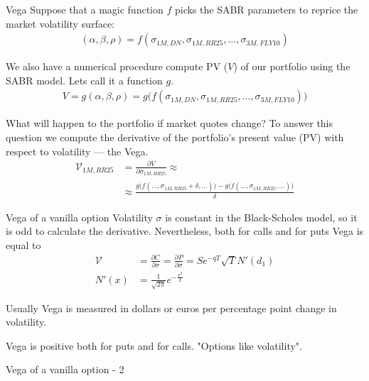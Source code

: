 \documentclass{beamer}
\begin{document}
\begin{frame}{Vega}
\justify
Suppose that a magic function $f$ picks the SABR parameters to reprice the market volatility surface:
\begin{align*}
(\alpha, \beta, \rho) = f(\sigma_{1M,DN}, \sigma_{1M,RR25}, ..., \sigma_{3M,FLY10})
\end{align*}

\justify
We also have a numerical procedure compute PV ($V$) of our portfolio using the SABR model. Lets call it a function $g$.
\begin{align*}
V = g(\alpha, \beta, \rho) = g\Big(f(\sigma_{1M,DN}, \sigma_{1M,RR25}, ..., \sigma_{3M,FLY10})\Big)
\end{align*}

\justify
What will happen to the portfolio if market quotes change? To answer this question we compute the derivative of the portfolio's present value (PV) with respect to volatility --- the \alert{Vega}.
\begin{align*}
\mathcal{V}_{1M,RR25} &= \frac{\partial V}{\partial \sigma_{1M,RR25}} \approx \\
&\approx \frac{g\Big(f(...,\sigma_{1M,RR25}+\delta,...)\Big) - g\Big(f(...,\sigma_{1M,RR25},...)\Big)}{\delta}
\end{align*}
\end{frame}



\begin{frame}{Vega of a vanilla option}
\justify
Volatility $\sigma$ is constant in the Black-Scholes model, so it is odd to calculate the derivative. Nevertheless, both for calls and for puts Vega is equal to
\begin{align*}
\mathcal{V} &= \frac{\partial C}{\partial \sigma} = \frac{\partial P}{\partial \sigma} = Se^{-qT}\sqrt{T}N'(d_1) \\
N'(x) &= \frac{1}{\sqrt{2\pi}}e^{-\frac{x^2}{2}}
\end{align*}

\justify
Usually Vega is measured in dollars or euros per percentage point change in volatility.

\justify
Vega is positive both for puts and for calls. "Options like volatility".
\end{frame}



\begin{frame}{Vega of a vanilla option - 2}
\centering
{}
\end{frame}
\end{document}
